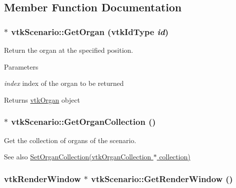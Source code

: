 \subsection{Member Function Documentation}
\hypertarget{classvtkScenario_ab4eab345474f9ad99730b0b3468c514c}{
\subsubsection[{GetOrgan}]{ $\ast$ vtkScenario::GetOrgan (vtkIdType {\em id})}}
\label{classvtkScenario_ab4eab345474f9ad99730b0b3468c514c}


Return the organ at the specified position. 
\begin{DoxyParams}{Parameters}
\item[{\em index}]index of the organ to be returned \end{DoxyParams}
\begin{DoxyReturn}{Returns}
\hyperlink{classvtkOrgan}{vtkOrgan} object 
\end{DoxyReturn}
\hypertarget{classvtkScenario_a9e518be8bb47a65ae2b8a8ef02f579df}{
\subsubsection[{GetOrganCollection}]{ $\ast$ vtkScenario::GetOrganCollection ()}}
\label{classvtkScenario_a9e518be8bb47a65ae2b8a8ef02f579df}


Get the collection of organs of the scenario. \begin{DoxySeeAlso}{See also}
\hyperlink{classvtkScenario_afff48d5fa445019c74d0ae9b6cc42376}{SetOrganCollection(vtkOrganCollection $\ast$ collection)} 
\end{DoxySeeAlso}
\hypertarget{classvtkScenario_a4a3cb31864be1da763b5acb3377a32db}{
\subsubsection[{GetRenderWindow}]{\setlength{\rightskip}{0pt plus 5cm}vtkRenderWindow $\ast$ vtkScenario::GetRenderWindow ()}}
\label{classvtkScenario_a4a3cb31864be1da763b5acb3377a32db}


